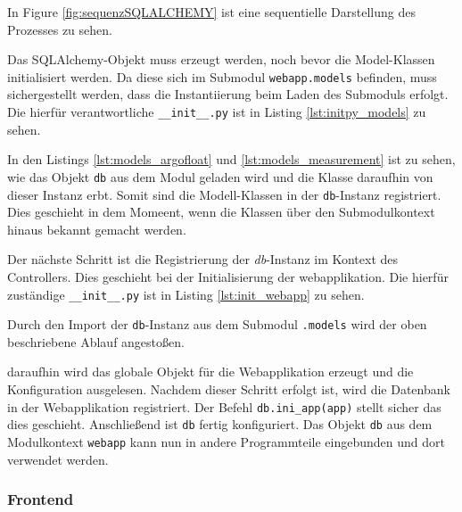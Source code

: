 In Figure \ref{fig:sequenzSQLALCHEMY} ist eine sequentielle Darstellung des Prozesses zu sehen. 


Das SQLAlchemy-Objekt muss erzeugt werden, noch bevor die Model-Klassen initialisiert werden. Da diese sich im Submodul \texttt{webapp.models} befinden, muss sichergestellt werden, dass die Instantiierung beim Laden des Submoduls erfolgt. Die hierfür verantwortliche \texttt{\_\_init\_\_.py} ist in Listing \ref{lst:initpy_models} zu sehen.



In den Listings \ref{lst:models_argofloat} und \ref{lst:models_measurement} ist zu sehen, wie das Objekt \texttt{db} aus dem Modul geladen wird und die Klasse daraufhin von dieser Instanz erbt. Somit sind die Modell-Klassen in der \texttt{db}-Instanz registriert. Dies geschieht in dem Momeent, wenn die Klassen über den Submodulkontext hinaus bekannt gemacht werden.


Der nächste Schritt ist die Registrierung der \textit{db}-Instanz im Kontext des Controllers. Dies geschieht bei der Initialisierung der webapplikation. Die hierfür zuständige \texttt{\_\_init\_\_.py} ist in Listing  \ref{lst:init_webapp} zu sehen.

    
Durch den Import der \texttt{db}-Instanz aus dem Submodul \texttt{.models} wird der oben beschriebene Ablauf angestoßen. 

daraufhin wird das globale Objekt für die Webapplikation erzeugt und die Konfiguration ausgelesen. Nachdem dieser Schritt erfolgt ist, wird die Datenbank in der Webapplikation registriert. Der Befehl \texttt{db.ini\_app(app)} stellt sicher das dies geschieht. Anschließend ist \texttt{db} fertig konfiguriert. Das Objekt \texttt{db} aus dem Modulkontext \texttt{webapp} kann nun in andere Programmteile eingebunden und dort verwendet werden.


\subsubsection{Frontend}



